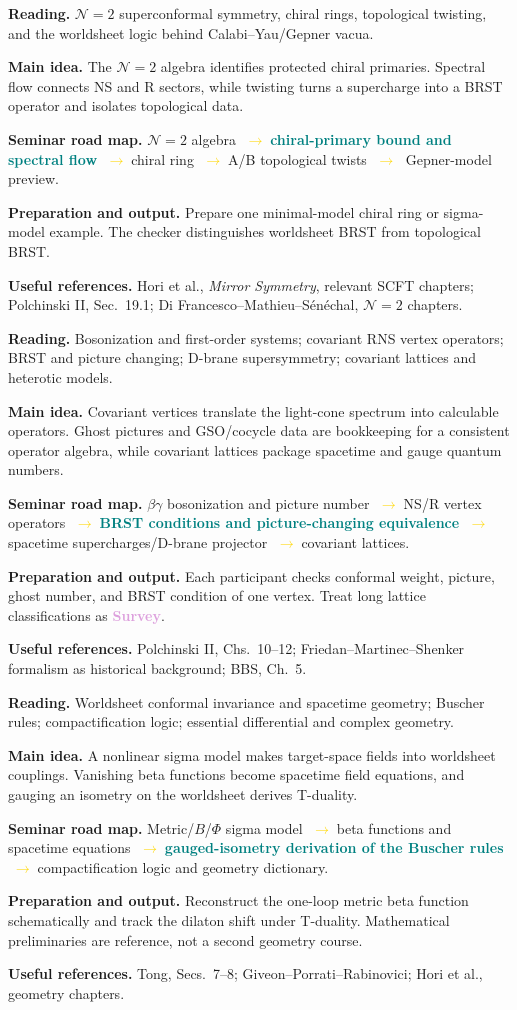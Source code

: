 \documentclass[11pt]{article}
\newcommand{\survey}{\textcolor{plum}{\textbf{Survey}}}
\newcommand{\essential}[1]{\textcolor{teal}{\textbf{#1}}}
\newcommand{\roadarrow}{\textcolor{gold}{\ensuremath{\;\longrightarrow\;}}}
\newcommand{\seminarweek}[7]{%
  \begin{tcolorbox}[
    enhanced,
    colback=white,colframe=navy,
    boxrule=0.65pt,arc=1.5mm,
    left=3mm,right=3mm,top=2mm,bottom=2mm,
    title={#1\hfill\normalfont #2},
    fonttitle=\bfseries,coltitle=white,colbacktitle=navy
  ]
  \textbf{Reading.} #3

  \textbf{Main idea.} #4

  \textbf{Seminar road map.} #5

  \textbf{Preparation and output.} #6

  \textbf{Useful references.} #7
  \end{tcolorbox}
}
\begin{document}
\seminarweek{Week 19}{Ch.~12.2--12.3, pp.~370--390; preview 15.4--15.5}
{$\mathcal N=2$ superconformal symmetry, chiral rings, topological twisting, and
the worldsheet logic behind Calabi--Yau/Gepner vacua.}
{The $\mathcal N=2$ algebra identifies protected chiral primaries.  Spectral
flow connects NS and R sectors, while twisting turns a supercharge into a BRST
operator and isolates topological data.}
{$\mathcal N=2$ algebra \roadarrow \essential{chiral-primary bound and spectral
flow} \roadarrow chiral ring \roadarrow A/B topological twists \roadarrow
Gepner-model preview.}
{Prepare one minimal-model chiral ring or sigma-model example.  The checker
distinguishes worldsheet BRST from topological BRST.}
{Hori et al., \emph{Mirror Symmetry}, relevant SCFT chapters; Polchinski II,
Sec.~19.1; Di Francesco--Mathieu--S\'en\'echal, $\mathcal N=2$ chapters.}

\seminarweek{Week 20}{Ch.~13, pp.~391--426; connect 15.6}
{Bosonization and first-order systems; covariant RNS vertex operators; BRST and
picture changing; D-brane supersymmetry; covariant lattices and heterotic
models.}
{Covariant vertices translate the light-cone spectrum into calculable operators.
Ghost pictures and GSO/cocycle data are bookkeeping for a consistent operator
algebra, while covariant lattices package spacetime and gauge quantum numbers.}
{$\beta\gamma$ bosonization and picture number \roadarrow NS/R vertex operators
\roadarrow \essential{BRST conditions and picture-changing equivalence}
\roadarrow spacetime supercharges/D-brane projector \roadarrow covariant lattices.}
{Each participant checks conformal weight, picture, ghost number, and BRST
condition of one vertex.  Treat long lattice classifications as \survey{}.}
{Polchinski II, Chs.~10--12; Friedan--Martinec--Shenker formalism as historical
background; BBS, Ch.~5.}

\seminarweek{Week 21}{Ch.~14.1--14.4, pp.~427--472}
{Worldsheet conformal invariance and spacetime geometry; Buscher rules;
compactification logic; essential differential and complex geometry.}
{A nonlinear sigma model makes target-space fields into worldsheet couplings.
Vanishing beta functions become spacetime field equations, and gauging an
isometry on the worldsheet derives T-duality.}
{Metric/$B$/$\Phi$ sigma model \roadarrow beta functions and spacetime equations
\roadarrow \essential{gauged-isometry derivation of the Buscher rules}
\roadarrow compactification logic and geometry dictionary.}
{Reconstruct the one-loop metric beta function schematically and track the
dilaton shift under T-duality.  Mathematical preliminaries are reference, not a
second geometry course.}
{Tong, Secs.~7--8; Giveon--Porrati--Rabinovici; Hori et al., geometry chapters.}
\end{document}
